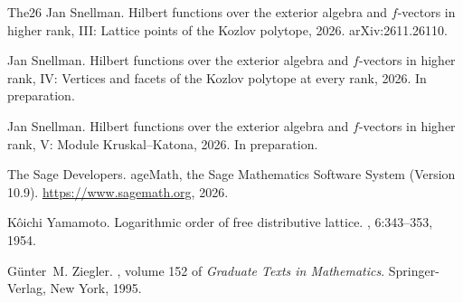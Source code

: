 \documentclass[11pt, a4paper, abstract=yes]{scrartcl}
\theoremstyle{definition}
\theoremstyle{remark}
\theoremstyle{plain}
\begin{document}
\begin{thebibliography}{{The}26}
Jan Snellman.
\newblock Hilbert functions over the exterior algebra and \(f\)-vectors in
  higher rank, {III}: Lattice points of the {K}ozlov polytope, 2026.
\newblock arXiv:2611.26110.

Jan Snellman.
\newblock Hilbert functions over the exterior algebra and \(f\)-vectors in
  higher rank, {IV}: Vertices and facets of the {K}ozlov polytope at every
  rank, 2026.
\newblock In preparation.

Jan Snellman.
\newblock Hilbert functions over the exterior algebra and \(f\)-vectors in
  higher rank, {V}: Module {K}ruskal--{K}atona, 2026.
\newblock In preparation.

{The Sage Developers}.
age{M}ath, the {S}age {M}athematics {S}oftware {S}ystem ({V}ersion
  10.9).
\newblock \url{https://www.sagemath.org}, 2026.

K\^{o}ichi Yamamoto.
\newblock Logarithmic order of free distributive lattice.
, 6:343--353, 1954.

G{\"u}nter~M. Ziegler.
, volume 152 of {\em Graduate Texts in
  Mathematics}.
\newblock Springer-Verlag, New York, 1995.

\end{thebibliography}
\end{document}
